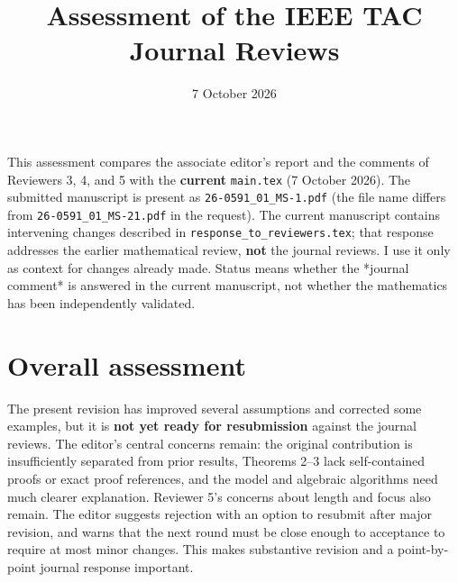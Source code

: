 \documentclass[11pt,a4paper]{article}
\title{Assessment of the IEEE TAC Journal Reviews}
\date{7 October 2026}
\begin{document}
\maketitle
This assessment compares the associate editor's report and the comments of Reviewers 3, 4, and 5 with the \textbf{current} \texttt{main.tex} (7 October 2026). The submitted manuscript is present as \texttt{26-0591\_01\_MS-1.pdf} (the file name differs from \texttt{26-0591\_01\_MS-21.pdf} in the request). The current manuscript contains intervening changes described in \texttt{response\_to\_reviewers.tex}; that response addresses the earlier mathematical review, \textbf{not} the journal reviews. I use it only as context for changes already made. Status means whether the *journal comment* is answered in the current manuscript, not whether the mathematics has been independently validated.

\section{Overall assessment}
The present revision has improved several assumptions and corrected some examples, but it is \textbf{not yet ready for resubmission} against the journal reviews. The editor's central concerns remain: the original contribution is insufficiently separated from prior results, Theorems 2–3 lack self-contained proofs or exact proof references, and the model and algebraic algorithms need much clearer explanation. Reviewer 5's concerns about length and focus also remain. The editor suggests rejection with an option to resubmit after major revision, and warns that the next round must be close enough to acceptance to require at most minor changes. This makes substantive revision and a point-by-point journal response important.
\end{document}
